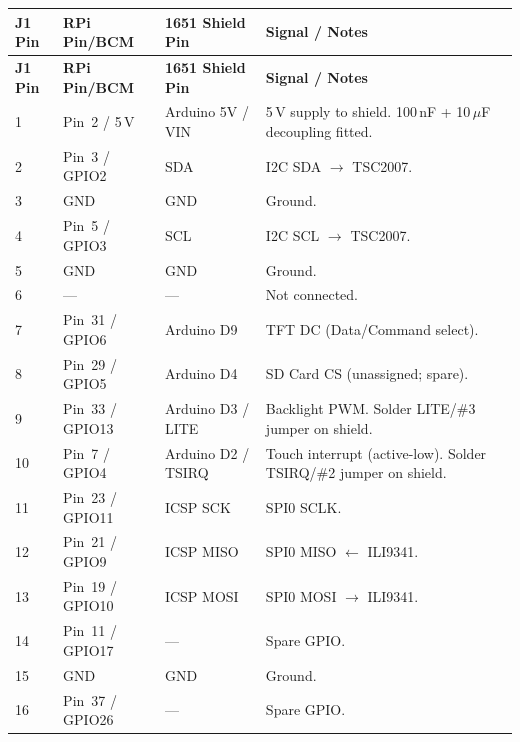 \documentclass[11pt,a4paper]{article}
\newcommand{\na}{---}
\begin{document}
\vspace{4pt}
\begin{longtable}{C{1.4cm} C{2.2cm} C{2.5cm} L{7.0cm}}
  \toprule
  \color{white}\textbf{J1 Pin} &
  \color{white}\textbf{RPi Pin/BCM} &
  \color{white}\textbf{1651 Shield Pin} &
  \color{white}\textbf{Signal / Notes} \\
  \midrule
  \endfirsthead
  \toprule
  \color{white}\textbf{J1 Pin} &
  \color{white}\textbf{RPi Pin/BCM} &
  \color{white}\textbf{1651 Shield Pin} &
  \color{white}\textbf{Signal / Notes} \\
  \midrule
  \endhead
  \bottomrule
  \endfoot

  1  & Pin~2 / 5\,V    & Arduino 5V / VIN & 5\,V supply to shield. 100\,nF + 10\,$\mu$F decoupling fitted. \\
  2  & Pin~3 / GPIO2   & SDA              & I2C SDA $\to$ TSC2007. \\
  3  & GND             & GND              & Ground. \\
  4  & Pin~5 / GPIO3   & SCL              & I2C SCL $\to$ TSC2007. \\
  5  & GND             & GND              & Ground. \\
  6  & \na             & \na              & Not connected. \\
  7  & Pin~31 / GPIO6  & Arduino D9       & TFT DC (Data/Command select). \\
  8  & Pin~29 / GPIO5  & Arduino D4       & SD Card CS (unassigned; spare). \\
  9  & Pin~33 / GPIO13 & Arduino D3 / LITE & Backlight PWM. Solder LITE/\#3 jumper on shield. \\
  10 & Pin~7 / GPIO4   & Arduino D2 / TSIRQ & Touch interrupt (active-low). Solder TSIRQ/\#2 jumper on shield. \\
  11 & Pin~23 / GPIO11 & ICSP SCK         & SPI0 SCLK. \\
  12 & Pin~21 / GPIO9  & ICSP MISO        & SPI0 MISO $\leftarrow$ ILI9341. \\
  13 & Pin~19 / GPIO10 & ICSP MOSI        & SPI0 MOSI $\to$ ILI9341. \\
  14 & Pin~11 / GPIO17 & \na              & Spare GPIO. \\
  15 & GND             & GND              & Ground. \\
  16 & Pin~37 / GPIO26 & \na              & Spare GPIO. \\

\end{longtable}
\end{document}
